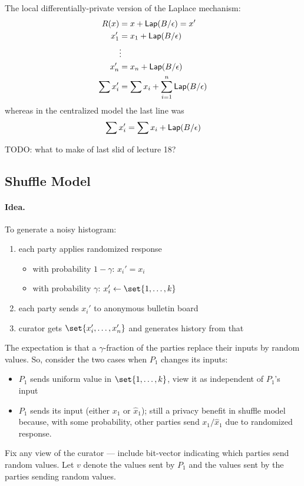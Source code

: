 The local differentially-private version of the Laplace mechanism:
\begin{align*}
    R(x) &= x + \mathsf{Lap}(B/\epsilon) = x' \\
    x_1' &= x_1 + \mathsf{Lap}(B/\epsilon) \\
    &\vdots \\
    x_n' &= x_n + \mathsf{Lap}(B/\epsilon) \\
    \sum x_i' &= \sum x_i + \sum_{i=1}^n \mathsf{Lap}(B/\epsilon)
\end{align*}
whereas in the centralized model the last line was 
\[
    \sum x_i' = \sum x_i + \mathsf{Lap}(B/\epsilon)
\]

TODO: what to make of last slid of lecture 18?


\subsection{Shuffle Model}


\paragraph{Idea.} To generate a noisy histogram:
\begin{enumerate}
\item each party applies randomized response
\begin{itemize}
    \item with probability $1 - \gamma$: $x_i' = x_i$
    \item with probability $\gamma$: $x_i' \gets \set{1, \dots, k}$
\end{itemize}
\item each party sends $x_i'$ to anonymous bulletin board
\item curator gets $\set{x_i', \dots, x_n'}$ and generates history from that
\end{enumerate}

The expectation is that a $\gamma$-fraction of the parties replace their inputs by random values.
So, consider the two cases when $P_1$ changes its inputs:
\begin{itemize}
\item $P_1$ sends uniform value in $\set{1, \dots, k}$, view it as independent of $P_1$'s input
\item $P_1$ sends its input (either $x_1$ or $\hat{x}_1$);
still a privacy benefit in shuffle model because, with some probability, other parties send $x_1/\hat{x}_1$ due to randomized response.
\end{itemize}
Fix any view of the curator --- include bit-vector indicating which parties send random values. Let $v$ denote the values sent by $P_1$ and the values sent by the parties sending random values.

